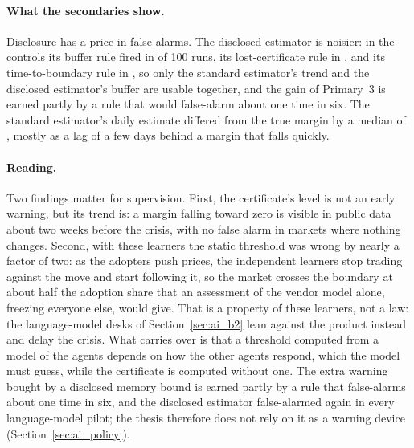 \paragraph{What the secondaries show.} Disclosure has a price in false alarms. The disclosed estimator is noisier: in the controls its buffer rule fired in \BoneFAdiscBuf{} of 100 runs, its lost-certificate rule in \BoneFAdiscLost{}, and its time-to-boundary rule in \BoneFAdiscTtz{}, so only the standard estimator's trend and the disclosed estimator's buffer are usable together, and the gain of Primary~3 is earned partly by a rule that would false-alarm about one time in six. The standard estimator's daily estimate differed from the true margin by a median of \BoneTrack{}, mostly as a lag of a few days behind a margin that falls quickly.

\paragraph{Reading.} Two findings matter for supervision. First, the certificate's level is not an early warning, but its trend is: a margin falling toward zero is visible in public data about two weeks before the crisis, with no false alarm in markets where nothing changes. Second, with these learners the static threshold was wrong by nearly a factor of two: as the adopters push prices, the independent learners stop trading against the move and start following it, so the market crosses the boundary at about half the adoption share that an assessment of the vendor model alone, freezing everyone else, would give. That is a property of these learners, not a law: the language-model desks of Section~\ref{sec:ai_b2} lean against the product instead and delay the crisis. What carries over is that a threshold computed from a model of the agents depends on how the other agents respond, which the model must guess, while the certificate is computed without one. The extra warning bought by a disclosed memory bound is earned partly by a rule that false-alarms about one time in six, and the disclosed estimator false-alarmed again in every language-model pilot; the thesis therefore does not rely on it as a warning device (Section~\ref{sec:ai_policy}).
